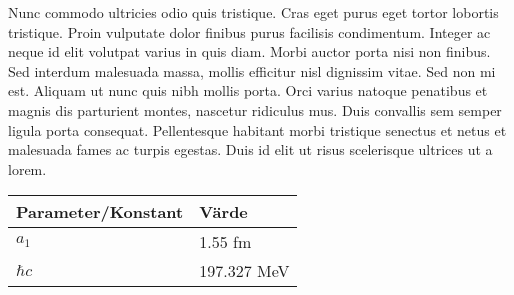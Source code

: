 Nunc commodo ultricies odio quis tristique. Cras eget purus eget tortor lobortis tristique. Proin vulputate dolor finibus purus facilisis condimentum. Integer ac neque id elit volutpat varius in quis diam. Morbi auctor porta nisi non finibus. Sed interdum malesuada massa, mollis efficitur nisl dignissim vitae. Sed non mi est. Aliquam ut nunc quis nibh mollis porta. Orci varius natoque penatibus et magnis dis parturient montes, nascetur ridiculus mus. Duis convallis sem semper ligula porta consequat. Pellentesque habitant morbi tristique senectus et netus et malesuada fames ac turpis egestas. Duis id elit ut risus scelerisque ultrices ut a lorem.

\begin{Table}
\captionsetup{labelfont=bf}
\begin{tabularx}{\textwidth}{XX}
\hline
Parameter/Konstant  & Värde       \\ %
\hline
$a_1$     & 1.55 fm     \\
$\hbar c$ & 197.327 MeV \\ \hline
\end{tabularx}
\label{tab:const}
\end{Table}